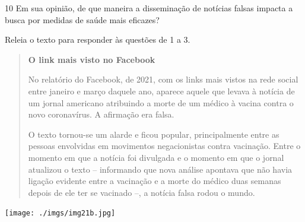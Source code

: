 \num{10} Em sua opinião, de que maneira a disseminação de notícias falsas
impacta a busca por medidas de saúde mais eficazes?



Releia o texto para responder às questões de 1 a 3.\medskip

\begin{minipage}{.5\textwidth}
\begin{quote}
\textbf{O link mais visto no Facebook}

No relatório do Facebook, de 2021, com os links mais vistos na rede social
entre janeiro e março daquele ano, aparece aquele que levava à notícia
de um jornal americano atribuindo a morte de um médico à vacina contra
o novo coronavírus. A afirmação era falsa.

O texto tornou-se um alarde e ficou popular, principalmente entre as pessoas
envolvidas em movimentos negacionistas contra vacinação. Entre o momento em
que a notícia foi divulgada e o momento em que o jornal atualizou o texto –
informando que nova análise apontava que não havia ligação evidente entre a
vacinação e a morte do médico duas semanas depois de ele ter se vacinado –,
a notícia falsa rodou o mundo.
\end{quote}
\end{minipage}\hspace{1cm}
\begin{minipage}{.5\textwidth}
\texttt{[image: ./imgs/img21b.jpg]}
\end{minipage}

